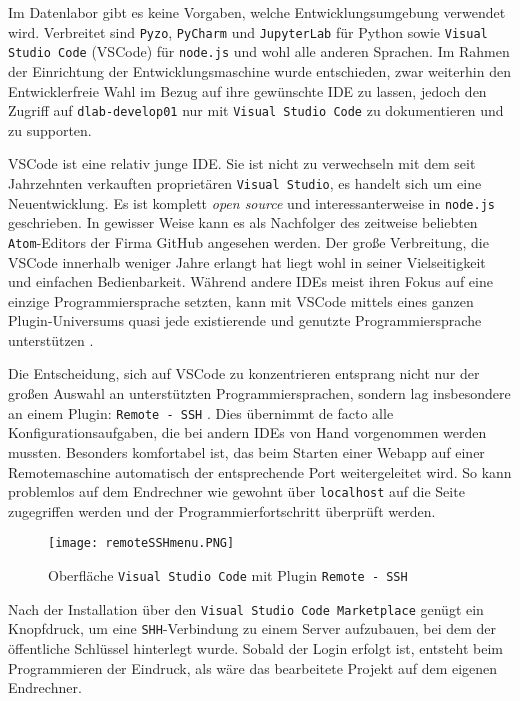 Im Datenlabor gibt es keine Vorgaben, welche Entwicklungsumgebung verwendet wird. Verbreitet sind \texttt{Pyzo}, \texttt{PyCharm} und \texttt{JupyterLab} für Python sowie \texttt{Visual Studio Code} (VSCode) für \texttt{node.js} und wohl alle anderen Sprachen.
Im Rahmen der Einrichtung der Entwicklungsmaschine wurde entschieden, zwar weiterhin den Entwickler\gginnen freie Wahl im Bezug auf ihre gewünschte IDE zu lassen, jedoch den Zugriff auf \texttt{dlab-develop01} nur mit \texttt{Visual Studio Code} zu dokumentieren und zu supporten. 

VSCode ist eine relativ junge IDE.
Sie ist nicht zu verwechseln mit dem seit Jahrzehnten verkauften proprietären \texttt{Visual Studio}, es handelt sich um eine Neuentwicklung.
Es ist komplett \textit{open source} \cite{vscodegithub} und interessanterweise in \texttt{node.js} geschrieben.
In gewisser Weise kann es als Nachfolger des zeitweise beliebten \texttt{Atom}-Editors der Firma GitHub angesehen werden.
Der große Verbreitung, die VSCode innerhalb weniger Jahre erlangt hat liegt wohl in seiner Vielseitigkeit und einfachen Bedienbarkeit. Während andere IDEs meist ihren Fokus auf eine einzige Programmiersprache setzten, kann mit VSCode mittels eines ganzen Plugin-Universums quasi jede existierende und genutzte Programmiersprache unterstützen \cite{brainfuck}.

Die Entscheidung, sich auf VSCode zu konzentrieren entsprang nicht nur der großen Auswahl an unterstützten Programmiersprachen, sondern lag insbesondere an einem Plugin: \texttt{Remote - SSH} \cite{remotessh}.
Dies übernimmt de facto alle Konfigurationsaufgaben, die bei andern IDEs von Hand vorgenommen werden mussten.
Besonders komfortabel ist, das beim Starten einer Webapp auf einer Remotemaschine automatisch der entsprechende Port weitergeleitet wird.
So kann problemlos auf dem Endrechner wie gewohnt über \texttt{localhost} auf die Seite zugegriffen werden und der Programmierfortschritt überprüft werden.
\\
\begin{figure}[h!]
\texttt{[image: remoteSSHmenu.PNG]}
\caption{Oberfläche \texttt{Visual Studio Code} mit Plugin \texttt{Remote - SSH}}
\label{remotesshpic}
\end{figure}

Nach der Installation über den \texttt{Visual Studio Code Marketplace} genügt ein Knopfdruck, um eine \texttt{SHH}-Verbindung zu einem Server aufzubauen, bei dem der öffentliche Schlüssel hinterlegt wurde.
Sobald der Login erfolgt ist, entsteht beim Programmieren der Eindruck, als wäre das bearbeitete Projekt auf dem eigenen Endrechner.